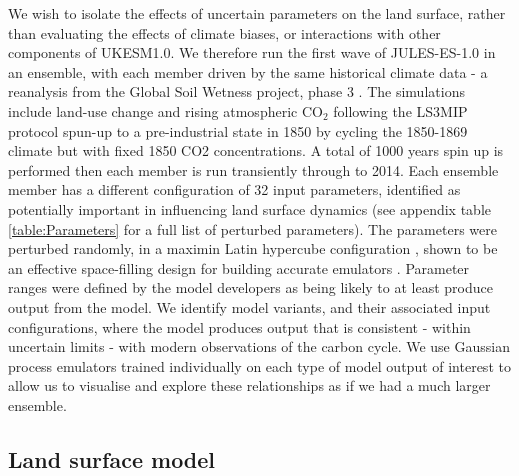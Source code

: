 \documentclass[gmd, manuscript]{copernicus}
\begin{document}
We wish to isolate the effects of uncertain parameters on the land surface, rather than evaluating the effects of climate biases, or interactions with other components of UKESM1.0. We therefore run the first wave of JULES-ES-1.0 in an ensemble, with each member driven by the same historical climate data - a reanalysis from the Global Soil Wetness project, phase 3 \citep{kim2017global}. The simulations include land-use change and rising atmospheric CO$_2$ following the LS3MIP protocol \citep{gmd-9-2809-2016} spun-up to a pre-industrial state in 1850 by cycling the 1850-1869 climate but with fixed 1850 CO2 concentrations. A total of 1000 years spin up is performed then each member is run transiently through to 2014. Each ensemble member has a different configuration of 32 input parameters, identified as potentially important in influencing land surface dynamics (see appendix table \ref{table:Parameters} for a full list of perturbed parameters). The parameters were perturbed randomly, in a maximin Latin hypercube configuration \citep{mckay1979comparison}, shown to be an effective space-filling design for building accurate emulators \citep{urban2010comparison}. Parameter ranges were defined by the model developers as being likely to at least produce output from the model. We identify model variants, and their associated input configurations, where the model produces output that is consistent - within uncertain limits - with modern observations of the carbon cycle. We use Gaussian process emulators trained individually on each type of model output of interest to allow us to visualise and explore these relationships as if we had a much larger ensemble.


\subsection{Land surface model}\label{ssec:land_surface_model}
\end{document}
